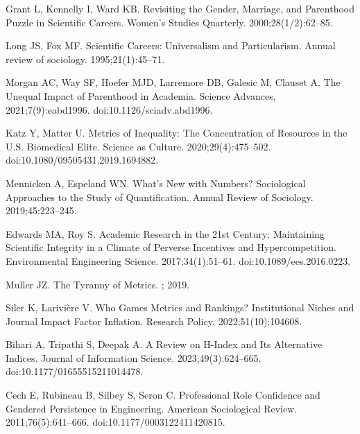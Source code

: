 \documentclass[
  10pt,
  letterpaper,
]{article}
\begin{document}
\begin{thebibliography}{10}
Grant L, Kennelly I, Ward KB.
\newblock Revisiting the Gender, Marriage, and Parenthood Puzzle in Scientific Careers.
\newblock Women's Studies Quarterly. 2000;28(1/2):62--85.

Long JS, Fox MF.
\newblock Scientific Careers: {{Universalism}} and Particularism.
\newblock Annual review of sociology. 1995;21(1):45--71.

Morgan AC, Way SF, Hoefer MJD, Larremore DB, Galesic M, Clauset A.
\newblock The Unequal Impact of Parenthood in Academia.
\newblock Science Advances. 2021;7(9):eabd1996.
\newblock doi:{10.1126/sciadv.abd1996}.

Katz Y, Matter U.
\newblock Metrics of {{Inequality}}: {{The Concentration}} of {{Resources}} in the {{U}}.{{S}}. {{Biomedical Elite}}.
\newblock Science as Culture. 2020;29(4):475--502.
\newblock doi:{10.1080/09505431.2019.1694882}.

Mennicken A, Espeland WN.
\newblock What's New with Numbers? {{Sociological}} Approaches to the Study of Quantification.
\newblock Annual Review of Sociology. 2019;45:223--245.

Edwards MA, Roy S.
\newblock Academic {{Research}} in the 21st {{Century}}: {{Maintaining Scientific Integrity}} in a {{Climate}} of {{Perverse Incentives}} and {{Hypercompetition}}.
\newblock Environmental Engineering Science. 2017;34(1):51--61.
\newblock doi:{10.1089/ees.2016.0223}.

Muller JZ.
\newblock The Tyranny of Metrics.
; 2019.

Siler K, Larivi{\`e}re V.
\newblock Who Games Metrics and Rankings? {{Institutional}} Niches and Journal Impact Factor Inflation.
\newblock Research Policy. 2022;51(10):104608.

Bihari A, Tripathi S, Deepak A.
\newblock A Review on H-Index and Its Alternative Indices.
\newblock Journal of Information Science. 2023;49(3):624--665.
\newblock doi:{10.1177/01655515211014478}.

Cech E, Rubineau B, Silbey S, Seron C.
\newblock Professional {{Role Confidence}} and {{Gendered Persistence}} in {{Engineering}}.
\newblock American Sociological Review. 2011;76(5):641--666.
\newblock doi:{10.1177/0003122411420815}.


\end{thebibliography}
\end{document}
